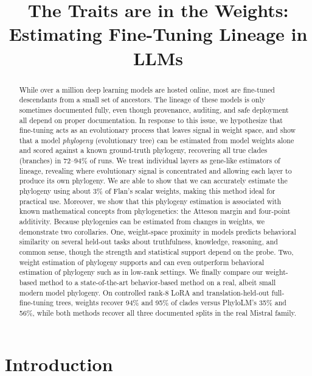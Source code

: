 \documentclass{article}
\title{The Traits are in the Weights: Estimating Fine-Tuning Lineage in LLMs}
\theoremstyle{definition}
\theoremstyle{plain}
\begin{document}
\maketitle

\begin{abstract}
While over a million deep learning models are hosted online, most are fine-tuned descendants from a small set of ancestors.  The lineage of these models is only sometimes documented fully, even though provenance, auditing, and safe deployment all depend on proper documentation. In response to this issue, we hypothesize that fine-tuning acts as an evolutionary process that leaves signal in weight space, and show that a model \textit{phylogeny} (evolutionary tree) can be estimated from model weights alone and scored against a known ground-truth phylogeny, recovering all true clades (branches) in 72--94\% of runs.  We treat individual layers as gene-like estimators of lineage, revealing where evolutionary signal is concentrated and allowing each layer to produce its own phylogeny.  We are able to show that we can accurately estimate the phylogeny using about 3\% of Flan's scalar weights, making this method ideal for practical use. Moreover, we show that this phylogeny estimation is associated with known mathematical concepts from phylogenetics: the Atteson margin and four-point additivity. Because phylogenies can be estimated from changes in weights, we demonstrate two corollaries.  One, weight-space proximity in models predicts behavioral similarity on several held-out tasks about truthfulness, knowledge, reasoning, and common sense, though the strength and statistical support depend on the probe.  Two, weight estimation of phylogeny supports and can even outperform behavioral estimation of phylogeny such as in low-rank settings.  We finally compare our weight-based method to a state-of-the-art behavior-based method on a real, albeit small modern model phylogeny. On controlled rank-8 LoRA and translation-held-out full-fine-tuning trees, weights recover 94\% and 95\% of clades versus PhyloLM's 35\% and 56\%, while both methods recover all three documented splits in the real Mistral family.

\end{abstract}

\section{Introduction}
\label{sec:intro}
\end{document}
